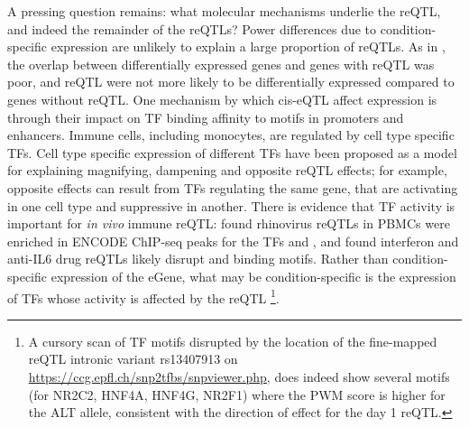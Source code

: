 A pressing question remains: what molecular mechanisms underlie the  \gls{reQTL}, and indeed the remainder of the \glspl{reQTL}?
Power differences due to condition-specific expression are unlikely to explain a large proportion of reQTLs.
As in \autocite{kim-hellmuth2017GeneticRegulatoryEffects, davenport2018DiscoveringVivoCytokineeQTL}, the overlap between differentially expressed genes and genes with reQTL was poor,
and reQTL were not more likely to be differentially expressed compared to genes without reQTL.
%
One mechanism by which cis-eQTL affect expression is through their impact on \gls{TF} binding affinity to motifs in promoters and enhancers\autocite{pai2015GeneticMechanisticBasis}.
Immune cells, including monocytes, are regulated by cell type specific \glspl{TF}\autocite{choudhury2016IdentifyingCellTypeSpecific}.
Cell type specific expression of different \glspl{TF} have been proposed as a model for explaining magnifying, dampening and opposite reQTL effects;
for example, opposite effects can result from \glspl{TF} regulating the same gene, that are activating in one cell type and suppressive in another\autocite{fu2012UnravelingRegulatoryMechanisms}.
There is evidence that \gls{TF} activity is important for \textit{in vivo} immune reQTL:
\autocite{caliskan2015HostGeneticVariation} found rhinovirus reQTLs in \glspl{PBMC} were enriched in ENCODE ChIP-seq peaks for the \glspl{TF}  and ,
and \autocite{davenport2018DiscoveringVivoCytokineeQTL} found interferon and anti-IL6 drug reQTLs likely disrupt  and  binding motifs.
Rather than condition-specific expression of the eGene, what may be condition-specific is the expression of \glspl{TF} whose activity is affected by the reQTL%
\footnote{
    A cursory scan of \gls{TF} motifs disrupted by the location of the fine-mapped  reQTL intronic variant rs13407913 on \url{https://ccg.epfl.ch/snp2tfbs/snpviewer.php},
    does indeed show several motifs (for NR2C2, HNF4A, HNF4G, NR2F1)
    where the PWM score is higher for the ALT allele, 
    consistent with the direction of effect for the day 1 reQTL.
}.

